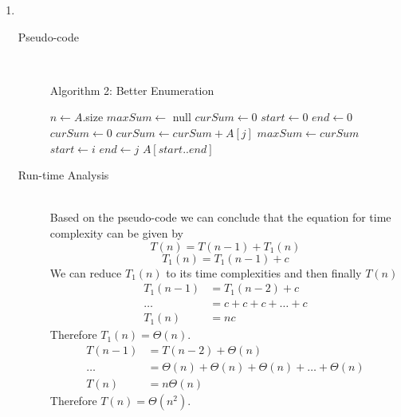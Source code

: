 \documentclass[paper=a4, fontsize=11pt]{scrartcl} %
\numberwithin{equation}{section} %
\numberwithin{figure}{section} %
\numberwithin{table}{section} %
\begin{document}
\begin{enumerate}[label=\bfseries Algorithm \arabic*:]
    \item \hfill \\
    \begin{description}
        \item[Pseudo-code] \hfill \\
        \begin{algorithmc}
            \caption{Algorithm 2: Better Enumeration}
                \State $n \gets A$.size
                \State $maxSum \gets$ null
                \State $curSum \gets 0$
                \State $start \gets 0$
                \State $end \gets 0$
                    \State $curSum \gets 0$
                        \State $curSum \gets curSum + A[j]$
                            \State $maxSum \gets curSum$
                            \State $start \gets i$
                            \State $end \gets j$
                        \EndIf
                    \EndFor
                \EndFor
                \State \Return $A[start..end]$
            \EndFunction
        \end{algorithmc}
        \item[Run-time Analysis] \hfill \\
        Based on the pseudo-code we can conclude that the equation for 
        time complexity can be given by
        \[ T(n) = T(n - 1) + T_1(n) \]
        \[ T_1(n) = T_1(n - 1) + c \]
        We can reduce $T_1(n)$ to its time complexities and then finally $T(n)$
        \begin{align*}
            T_1(n - 1) & = T_1(n - 2) + c \\
            \ldots & = c + c + c + \ldots + c \\
            T_1(n) & = nc
        \end{align*}
        Therefore $T_1(n) = \Theta(n)$.
        \begin{align*}
            T(n - 1) & = T(n - 2) + \Theta(n) \\
            \ldots & = \Theta(n) + \Theta(n) + \Theta(n) + \ldots + \Theta(n) \\
            T(n) & = n\Theta(n)
        \end{align*}
        Therefore $T(n) = \Theta(n^2)$.
    \end{description}


\end{enumerate}
\end{document}
